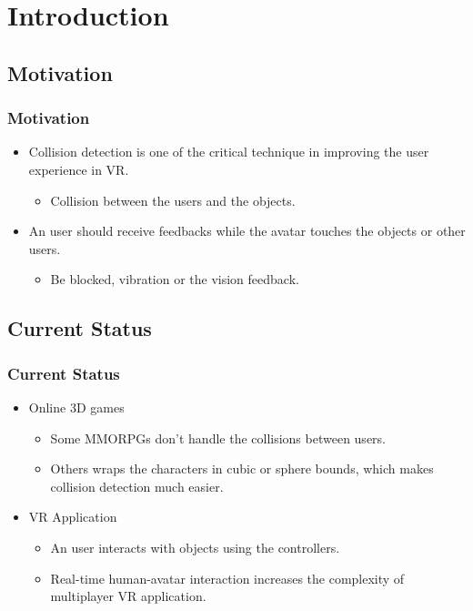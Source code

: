 \documentclass{beamer}
\begin{document}
\section{Introduction}

\subsection{Motivation}
	\begin{frame}
	\frametitle{Motivation}
	\begin{itemize}
		\item Collision detection is one of the critical technique in improving the user experience in VR.
            \begin{itemize}
                \item Collision between the users and the objects.
            \end{itemize}
		\medskip
		\item An user should receive feedbacks while the avatar touches the objects or other users.
            \begin{itemize}
                \item   Be blocked, vibration or the vision feedback.
            \end{itemize}
	\end{itemize}
	\end{frame}

\subsection{Current Status}
	\begin{frame}
	\frametitle{Current Status}
	\begin{itemize}
		\item Online 3D games
			\begin{itemize}
				\item Some MMORPGs don't handle the collisions between users.
				\item Others wraps the characters in cubic or sphere bounds, which makes collision detection much easier.
			\end{itemize}
		\medskip
		\item VR Application
			\begin{itemize}
				\item An user interacts with objects using the controllers.
				\item Real-time human-avatar interaction increases the complexity of multiplayer VR application.
			\end{itemize}
	\end{itemize}
	\end{frame}
\end{document}

